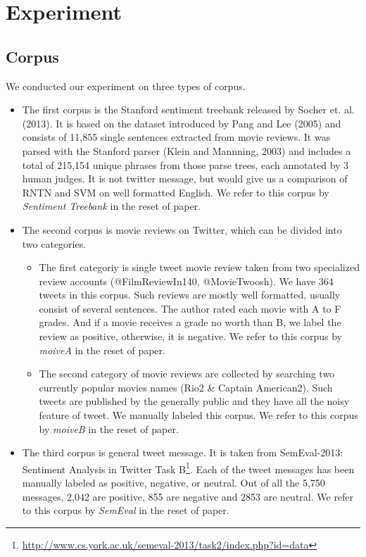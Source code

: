 \newpage
\section{Experiment}
\subsection{Corpus}
We conducted our experiment on three types of corpus.
\begin{itemize}
\item  The first corpus is the Stanford sentiment treebank released by Socher et. al. (2013). It is based on the dataset introduced by Pang and Lee (2005) and consists of 11,855 single sentences extracted from movie reviews. It was parsed with the Stanford parser (Klein and Mannning, 2003) and includes a total of 215,154 unique phrases from those parse trees, each annotated by 3 human judges. It is not twitter message, but would give us a comparison of RNTN and SVM on well formatted English. We refer to this corpus by \textit{Sentiment Treebank} in the reset of paper. 
\item  The second corpus is movie reviews on Twitter, which can be divided into two categories. 
\begin{itemize}
\item The first categoriy is single tweet movie review taken from two specialized review accounts (@FilmReviewIn140, @MovieTwoosh). We have 364 tweets in this corpus. Such reviews are mostly well formatted, usually consist of several sentences. The author rated each movie with A to F grades. And if a movie receives a grade no worth than B, we label the review as positive, otherwise, it is negative. We refer to this corpus by \textit{moiveA} in the reset of paper. 
\item The second category of movie reviews are collected by searching two currently popular movies names (Rio2 \& Captain American2). Such tweets are published by the generally public and they have all the noisy feature of tweet. We manually labeled this corpus. We refer to this corpus by \textit{moiveB} in the reset of paper. 
\end{itemize}
\item The third corpus is general tweet message. It is taken from SemEval-2013: Sentiment Analysis in Twitter Task B\footnote{\url{http://www.cs.york.ac.uk/semeval-2013/task2/index.php?id=data}}. Each of the tweet messages has been manually labeled as positive, negative, or neutral. Out of all the 5,750 messages, 2,042 are positive, 855 are negative and 2853 are neutral.  We refer to this corpus by \textit{SemEval} in the reset of paper. 
\end{itemize}

